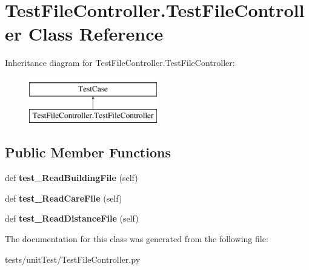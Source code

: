 \hypertarget{class_test_file_controller_1_1_test_file_controller}{}\section{Test\+File\+Controller.\+Test\+File\+Controller Class Reference}
\label{class_test_file_controller_1_1_test_file_controller}
Inheritance diagram for Test\+File\+Controller.\+Test\+File\+Controller\+:\begin{figure}[H]
\begin{center}
\leavevmode
\includegraphics[height=2.000000cm]{class_test_file_controller_1_1_test_file_controller}
\end{center}
\end{figure}
\subsection*{Public Member Functions}
\begin{DoxyCompactItemize}
\item 
\mbox{\label{class_test_file_controller_1_1_test_file_controller_a4459fe53869c56c33541fbfc63b340c6}} 
def {\bfseries test\+\_\+\+Read\+Building\+File} (self)
\item 
\mbox{\label{class_test_file_controller_1_1_test_file_controller_aee7a4d0bdc025d2963d9238b0036b999}} 
def {\bfseries test\+\_\+\+Read\+Care\+File} (self)
\item 
\mbox{\label{class_test_file_controller_1_1_test_file_controller_a7e98fe3da36c09e0f9681761d6a42871}} 
def {\bfseries test\+\_\+\+Read\+Distance\+File} (self)
\end{DoxyCompactItemize}


The documentation for this class was generated from the following file\+:\begin{DoxyCompactItemize}
\item 
tests/unit\+Test/Test\+File\+Controller.\+py\end{DoxyCompactItemize}
